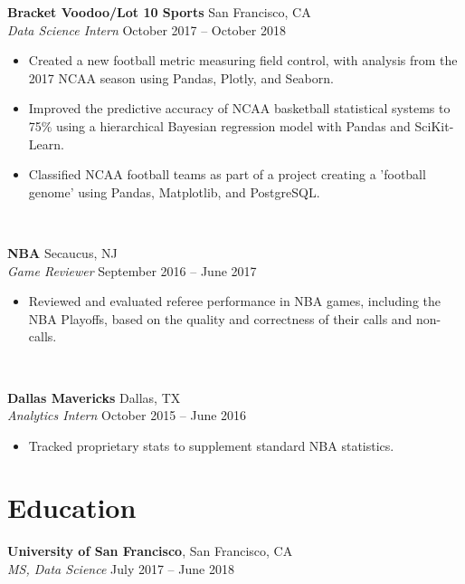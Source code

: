 \documentclass[line, margin]{res}
\begin{document}
\begin{resume}
	\textbf{Bracket Voodoo/Lot 10 Sports} \hfill{San Francisco, CA} \vspace{1mm}\\\vspace{0.5mm}%
	\textsl{Data Science Intern} \hfill {October 2017 -- October 2018}\
	\begin{itemize}
		\item Created a new football metric measuring field control, with analysis from the 2017 NCAA season using Pandas, Plotly, and Seaborn.
		\item Improved the predictive accuracy of NCAA basketball statistical systems to 75\% using a hierarchical Bayesian regression model with Pandas and SciKit-Learn.
		\item Classified NCAA football teams as part of a project creating a 'football genome' using Pandas, Matplotlib, and PostgreSQL.
	\end{itemize}\

	\textbf{NBA} \hfill{Secaucus, NJ} \vspace{1mm}\\\vspace{0.5mm}%
	\textsl{Game Reviewer} \hfill {September 2016 -- June 2017}\
	\begin{itemize}
		\item Reviewed and evaluated referee performance in NBA games, including the NBA Playoffs, based on the quality and correctness of their calls and non-calls.
	\end{itemize}\
	
	\textbf{Dallas Mavericks} \hfill{Dallas, TX} \vspace{1mm}\\\vspace{0.5mm}%
	\textsl{Analytics Intern} \hfill {October 2015 -- June 2016}\
	\begin{itemize}
		\item Tracked proprietary stats to supplement standard NBA statistics. %
	\end{itemize}
	
	
\section{Education}
	\textbf{University of San Francisco}, San Francisco, CA \vspace{1mm}\\\vspace{1mm}
	\textsl{MS, Data Science} \hfill {July 2017 -- June 2018}\


\end{resume}
\end{document}
